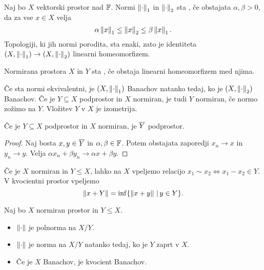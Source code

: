 Naj bo $X$ vektorski prostor nad $\mathbb{F}$.
Normi $\left\lVert\cdot\right\rVert_1$ in $\left\lVert\cdot\right\rVert_2$ sta , če
obstajata $\alpha, \beta > 0$, da za vse $x \in X$ velja
\[
  \alpha \left\lVert x\right\rVert_1 \le \left\lVert x\right\rVert_2 \le \beta \left\lVert x\right\rVert_1.
\]
Topologiji, ki jih normi porodita, sta enaki, zato je identiteta $(X,
\left\lVert\cdot\right\rVert_1) \to (X, \left\lVert\cdot\right\rVert_2)$ linearni homeomorfizem.

\begin{definicija}
  Normirana prostora $X$ in $Y$ sta , če obstaja linearni
  homeomorfizem med njima.
\end{definicija}


Če sta normi ekvivalentni, je $(X, \left\lVert\cdot\right\rVert_1)$ Banachov natanko tedaj, ko
je $(X, \left\lVert\cdot\right\rVert_2)$ Banachov.
Če je $Y \subseteq X$ podprostor in $X$ normiran, je tudi $Y$ normiran, če normo
zožimo na $Y$.
Vložitev $Y$ v $X$ je izometrija.

\begin{lema}
  Če je $Y \subseteq X$ podprostor in $X$ normiran, je $\overline{Y}$ podprostor.
\end{lema}

\begin{proof}
  Naj bosta $x, y \in \overline{Y}$ in $\alpha, \beta \in \mathbb{F}$.
  Potem obstajata zaporedji $x_n \to x$ in $y_n \to y$.
  Velja $\alpha x_n + \beta y_n \to \alpha x + \beta y$.
\end{proof}

Če je $X$ normiran in $Y \le X$, lahko na $X$ vpeljemo relacijo $x_1 \sim x_2
\iff x_1 - x_2 \in Y$.
V kvocientni prostor vpeljemo
\[
  \left\lVert x + Y\right\rVert = \inf \{ \left\lVert x+y\right\rVert \,|\, y \in Y \}.
\]

\begin{trditev}
  Naj bo $X$ normiran prostor in $Y \le X$.
  \begin{itemize}
  \item $\left\lVert\cdot\right\rVert$ je polnorma na $X/Y$.
  \item $\left\lVert\cdot\right\rVert$ je norma na $X/Y$ natanko tedaj, ko je $Y$ zaprt v $X$.
  \item Če je $X$ Banachov, je kvocient Banachov.
  \end{itemize}
\end{trditev}

